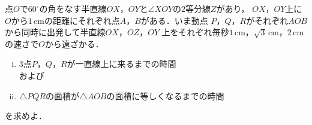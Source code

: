 \documentclass[a4j]{jarticle}
\title{}
\begin{document}

\begin{oframed}
点$O$で$60^\circ$の角をなす半直線$OX$，$OY$と$\angle XOY$の$2$等分線$Z$があり，
$OX$，$OY$上に$O$から$1\,\mathrm{cm}$の距離にそれぞれ点$A$，$B$がある．いま動点
$P$，$Q$，$R$がそれぞれ$A$$O$$B$から同時に出発して半直線$OX$，$OZ$，$OY$
上をそれぞれ毎秒$1\,\mathrm{cm}$，$\sqrt{3}\,\mathrm{cm}$，$2\,\mathrm{cm}$の速さで$O$から遠ざかる．
     \begin{enumerate}[(i)]
     \item $3$点$P$，$Q$，$R$が一直線上に来るまでの時間　\\
     および
     \item $\triangle PQR$の面積が$\triangle AOB$の面積に等しくなるまでの時間
     \end{enumerate}
を求めよ．     
\end{oframed}
\end{document}
